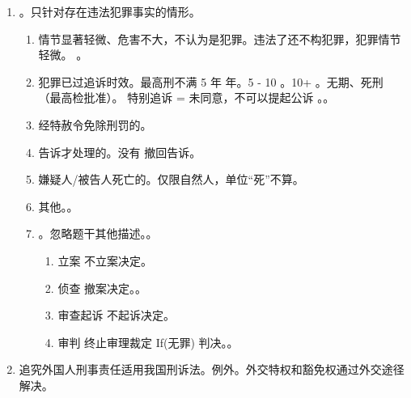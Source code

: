 \begin{enumerate}
\begin{enumerate}
\begin{kk}{听取意见}
\begin{enumerate}
                  \end{enumerate}
                \end{kk}
        \end{enumerate}
  \item \er {}。只针对存在违法犯罪事实的情形。
        \begin{enumerate}
          \item 情节显著轻微、危害不大，不认为是犯罪。违法了还不构犯罪，\bdy 犯罪情节轻微。
                。
          \item 犯罪已过追诉时效。最高刑不满 5 年  年。5 - 10 。10+ 。无期、死刑 （最高检批准）。
                特别追诉 = 未同意，不可以提起公诉 \bdy {}。。
          \item 经特赦令免除刑罚的。
          \item 告诉才处理的。没有 \hz 撤回告诉。
          \item 嫌疑人/被告人死亡的。仅限自然人，单位“死”不算。
          \item 其他。。
          \item {}。忽略题干其他描述。。
                \begin{enumerate}
                  \item 立案 \yjt 不立案决定。
                  \item 侦查 \yjt 撤案决定。。
                  \item 审查起诉 \yjt 不起诉决定。
                  \item 审判 \yjt 终止审理裁定 \yjt If(无罪) \yjt 判决。。
                \end{enumerate}
        \end{enumerate}
  \item 追究外国人刑事责任适用我国刑诉法。例外。外交特权和豁免权通过外交途径解决。
\end{enumerate}
